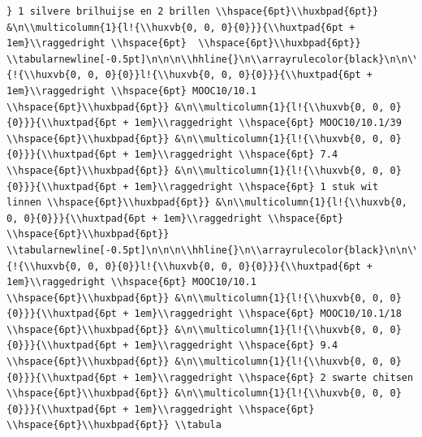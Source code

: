 \documentclass[11pt,preprint, authoryear]{elsarticle}
\numberwithin{equation}{section}
\numberwithin{figure}{section}
\numberwithin{table}{section}
\begin{document}
\begin{verbatim}
} 1 silvere brilhuijse en 2 brillen \\hspace{6pt}\\huxbpad{6pt}} &\n\\multicolumn{1}{l!{\\huxvb{0, 0, 0}{0}}}{\\huxtpad{6pt + 1em}\\raggedright \\hspace{6pt}  \\hspace{6pt}\\huxbpad{6pt}} \\tabularnewline[-0.5pt]\n\n\n\\hhline{}\n\\arrayrulecolor{black}\n\n\\multicolumn{1}{!{\\huxvb{0, 0, 0}{0}}l!{\\huxvb{0, 0, 0}{0}}}{\\huxtpad{6pt + 1em}\\raggedright \\hspace{6pt} MOOC10/10.1 \\hspace{6pt}\\huxbpad{6pt}} &\n\\multicolumn{1}{l!{\\huxvb{0, 0, 0}{0}}}{\\huxtpad{6pt + 1em}\\raggedright \\hspace{6pt} MOOC10/10.1/39 \\hspace{6pt}\\huxbpad{6pt}} &\n\\multicolumn{1}{l!{\\huxvb{0, 0, 0}{0}}}{\\huxtpad{6pt + 1em}\\raggedright \\hspace{6pt} 7.4 \\hspace{6pt}\\huxbpad{6pt}} &\n\\multicolumn{1}{l!{\\huxvb{0, 0, 0}{0}}}{\\huxtpad{6pt + 1em}\\raggedright \\hspace{6pt} 1 stuk wit linnen \\hspace{6pt}\\huxbpad{6pt}} &\n\\multicolumn{1}{l!{\\huxvb{0, 0, 0}{0}}}{\\huxtpad{6pt + 1em}\\raggedright \\hspace{6pt}  \\hspace{6pt}\\huxbpad{6pt}} \\tabularnewline[-0.5pt]\n\n\n\\hhline{}\n\\arrayrulecolor{black}\n\n\\multicolumn{1}{!{\\huxvb{0, 0, 0}{0}}l!{\\huxvb{0, 0, 0}{0}}}{\\huxtpad{6pt + 1em}\\raggedright \\hspace{6pt} MOOC10/10.1 \\hspace{6pt}\\huxbpad{6pt}} &\n\\multicolumn{1}{l!{\\huxvb{0, 0, 0}{0}}}{\\huxtpad{6pt + 1em}\\raggedright \\hspace{6pt} MOOC10/10.1/18 \\hspace{6pt}\\huxbpad{6pt}} &\n\\multicolumn{1}{l!{\\huxvb{0, 0, 0}{0}}}{\\huxtpad{6pt + 1em}\\raggedright \\hspace{6pt} 9.4 \\hspace{6pt}\\huxbpad{6pt}} &\n\\multicolumn{1}{l!{\\huxvb{0, 0, 0}{0}}}{\\huxtpad{6pt + 1em}\\raggedright \\hspace{6pt} 2 swarte chitsen \\hspace{6pt}\\huxbpad{6pt}} &\n\\multicolumn{1}{l!{\\huxvb{0, 0, 0}{0}}}{\\huxtpad{6pt + 1em}\\raggedright \\hspace{6pt}  \\hspace{6pt}\\huxbpad{6pt}} \\tabula
\end{verbatim}
\end{document}

